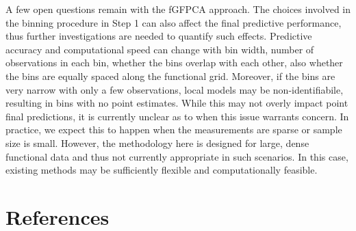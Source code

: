 \documentclass[
  11pt,
]{article}
\begin{document}
A few open questions remain with the fGFPCA approach. The choices
involved in the binning procedure in Step 1 can also affect the final
predictive performance, thus further investigations are needed to
quantify such effects. Predictive accuracy and computational speed can
change with bin width, number of observations in each bin, whether the
bins overlap with each other, also whether the bins are equally spaced
along the functional grid. Moreover, if the bins are very narrow with
only a few observations, local models may be non-identifiabile,
resulting in bins with no point estimates. While this may not overly
impact point final predictions, it is currently unclear as to when this
issue warrants concern. In practice, we expect this to happen when the
measurements are sparse or sample size is small. However, the
methodology here is designed for large, dense functional data and thus
not currently appropriate in such scenarios. In this case, existing
methods may be sufficiently flexible and computationally feasible.

\hypertarget{references}{%
\section{References}\label{references}}
\end{document}

